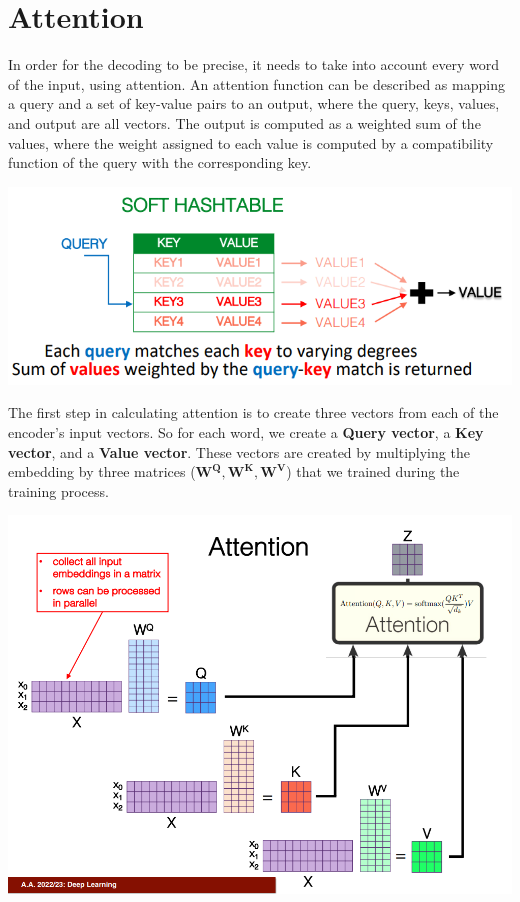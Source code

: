 \section{Attention}
In order for the decoding to be precise, it needs to take into account every word of the input, using attention.\newline\newline
An attention function can be described as mapping a query and a set of key-value pairs to an output, where the query, keys, values, and output are all vectors. The output is computed as a weighted sum of the values, where the weight assigned to each value is computed by a compatibility function of the query with the corresponding key.
\begin{center}
    \includegraphics[scale=0.8]{images/attention.png}
\end{center}
The first step in calculating attention is to create three vectors from each of the encoder’s input vectors. So for each word, we create a \textbf{Query vector}, a \textbf{Key vector}, and a \textbf{Value vector}. These vectors are created by multiplying the embedding by three matrices ($\textbf{W}^\textbf{Q}, \textbf{W}^\textbf{K}, \textbf{W}^\textbf{V}$) that we trained during the training process.
\begin{center}
    \includegraphics[scale=0.6]{images/attention 2.png}
\end{center}
